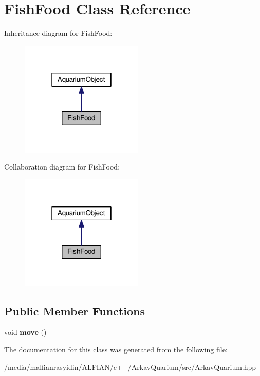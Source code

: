 \hypertarget{class_fish_food}{}\section{Fish\+Food Class Reference}
\label{class_fish_food}


Inheritance diagram for Fish\+Food\+:\nopagebreak
\begin{figure}[H]
\begin{center}
\leavevmode
\includegraphics[width=166pt]{class_fish_food__inherit__graph}
\end{center}
\end{figure}


Collaboration diagram for Fish\+Food\+:\nopagebreak
\begin{figure}[H]
\begin{center}
\leavevmode
\includegraphics[width=166pt]{class_fish_food__coll__graph}
\end{center}
\end{figure}
\subsection*{Public Member Functions}
\begin{DoxyCompactItemize}
\item 
\mbox{\label{class_fish_food_a411070d0e4f5c964ff34ca17fca0ec05}} 
void {\bfseries move} ()
\end{DoxyCompactItemize}


The documentation for this class was generated from the following file\+:\begin{DoxyCompactItemize}
\item 
/media/malfianrasyidin/\+A\+L\+F\+I\+A\+N/c++/\+Arkav\+Quarium/src/Arkav\+Quarium.\+hpp\end{DoxyCompactItemize}
